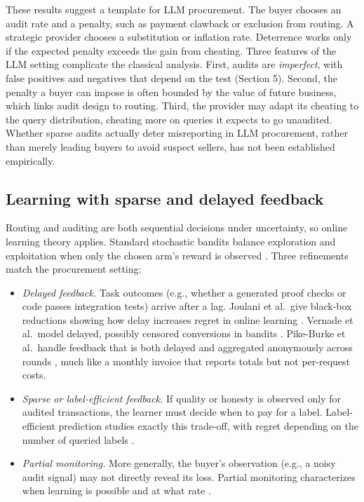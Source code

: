 \documentclass[sigconf]{acmart}
\providecommand{\tightlist}{%
  \setlength{\itemsep}{0pt}\setlength{\parskip}{0pt}}
\begin{document}
These results suggest a template for LLM procurement. The buyer chooses an audit rate and a penalty, such as payment clawback or exclusion from routing. A strategic provider chooses a substitution or inflation rate. Deterrence works only if the expected penalty exceeds the gain from cheating. Three features of the LLM setting complicate the classical analysis. First, audits are \emph{imperfect}, with false positives and negatives that depend on the test (Section 5). Second, the penalty a buyer can impose is often bounded by the value of future business, which links audit design to routing. Third, the provider may adapt its cheating to the query distribution, cheating more on queries it expects to go unaudited. Whether sparse audits actually deter misreporting in LLM procurement, rather than merely leading buyers to avoid suspect sellers, has not been established empirically.

\subsection{Learning with sparse and delayed feedback}\label{learning-with-sparse-and-delayed-feedback}

Routing and auditing are both sequential decisions under uncertainty, so online learning theory applies. Standard stochastic bandits balance exploration and exploitation when only the chosen arm's reward is observed \cite{auer2002ucb, lattimore2020bandit}. Three refinements match the procurement setting:

\begin{itemize}
\tightlist
\item
  \emph{Delayed feedback.} Task outcomes (e.g., whether a generated proof checks or code passes integration tests) arrive after a lag. Joulani et al.~give black-box reductions showing how delay increases regret in online learning \cite{joulani2013delayed}. Vernade et al.~model delayed, possibly censored conversions in bandits \cite{vernade2017delayed}. Pike-Burke et al.~handle feedback that is both delayed and aggregated anonymously across rounds \cite{pikeburke2018aggregated}, much like a monthly invoice that reports totals but not per-request costs.
\item
  \emph{Sparse or label-efficient feedback.} If quality or honesty is observed only for audited transactions, the learner must decide when to pay for a label. Label-efficient prediction studies exactly this trade-off, with regret depending on the number of queried labels \cite{cesabianchi2005label}.
\item
  \emph{Partial monitoring.} More generally, the buyer's observation (e.g., a noisy audit signal) may not directly reveal its loss. Partial monitoring characterizes when learning is possible and at what rate \cite{bartok2014partial}.
\end{itemize}
\end{document}
